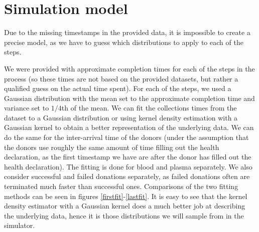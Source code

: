 \documentclass[a4paper,12pt]{article}
\begin{document}
\section{Simulation model}

Due to the missing timestamps in the provided data, it is impossible to create a precise model, as we have to guess which distributions to apply to each of the steps.

\bigbreak

We were provided with approximate completion times for each of the steps in the process (so these times are not based on the provided datasets, but rather a qualified guess on the actual time spent). For each of the steps, we used a Gaussian distribution with the mean set to the approximate completion time and variance set to $1/4$th of the mean.
We can fit the collections times from the dataset to a Gaussian distribution or using kernel density estimation with a Gaussian kernel to obtain a better representation of the underlying data. We can do the same for the inter-arrival time of the donors (under the assumption that the donors use roughly the same amount of time filling out the health declaration, as the first timestamp we have are after the donor has filled out the health declaration). The fitting is done for blood and plasma separately. We also consider successful and failed donations separately, as failed donations often are terminated much faster than successful ones. Comparisons of the two fitting methods can be seen in figures \ref{firstfit}-\ref{lastfit}. It is easy to see that the kernel density estimator with a Gaussian kernel does a much better job at describing the underlying data, hence it is those distributions we will sample from in the simulator.
\end{document}
